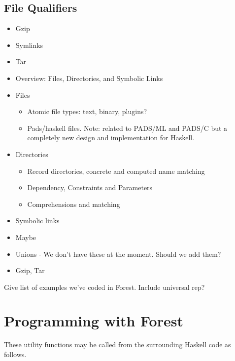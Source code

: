 \documentclass[natbib]{sigplanconf}
\begin{document}
\subsection{File Qualifiers}
\label{sec:basics}

\begin{itemize}
\item Gzip
\item Symlinks
\item Tar
\end{itemize}

\begin{itemize}
\item Overview: Files, Directories, and Symbolic Links
\item Files
\begin{itemize}
\item Atomic file types: text, binary, plugins?
\item Pads/haskell files.  Note: related to PADS/ML and PADS/C but
a completely new design and implementation for Haskell.
\end{itemize}
\item Directories
\begin{itemize}
\item Record directories, concrete and computed name matching
\item Dependency, Constraints and Parameters
\item Comprehensions and matching
\end{itemize}
\item Symbolic links
\item Maybe
\item Unions    - We don't have these at the moment.  Should we add them?
\item Gzip, Tar
\end{itemize}

Give list of examples we've coded in Forest.  Include universal rep?

\section{Programming with Forest}
\label{sec:exp}

These utility functions may be called from the surrounding Haskell code as follows.
\end{document}

